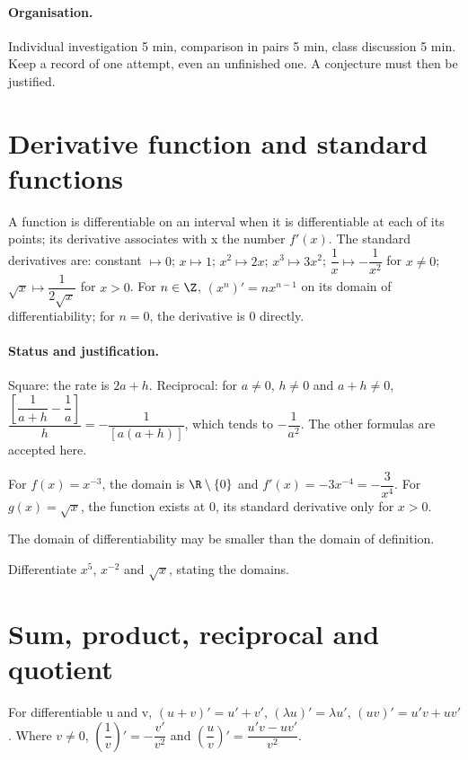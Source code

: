 \paragraph{Organisation.} Individual investigation 5 min, comparison in pairs 5 min, class discussion 5 min. Keep a record of one attempt, even an unfinished one. A conjecture must then be justified.
\mxnewpage
\section{Derivative function and standard functions}\label{C06-U1}
\begin{keypoint}
A function is differentiable on an interval when it is differentiable at each of its points; its derivative associates with x the number $f\prime(x)$. The standard derivatives are: constant $\mapsto0$; $x\mapsto1$; $x^2\mapsto2x$; $x^3\mapsto3x^2$; $\dfrac{1}{x}\mapsto -\dfrac{1}{x^2}$ for $x\ne0$; $\sqrt x\mapsto \dfrac{1}{2\sqrt x}$ for $x>0$. For $n\in\Z$, $(x^n)\prime=nx^{n-1}$ on its domain of differentiability; for $n=0$, the derivative is 0 directly.
\end{keypoint}
\paragraph{Status and justification.} Square: the rate is $2a+h$. Reciprocal: for $a\ne0$, $h\ne0$ and $a+h\ne0$, $\dfrac{[\dfrac{1}{a+h}-\dfrac{1}{a}]}{h}=-\dfrac{1}{[a(a+h)]}$, which tends to $-\dfrac{1}{a^2}$. The other formulas are accepted here.
\begin{example}For $f(x)=x^{-3}$, the domain is $\R\setminus\{0\}$ and $f\prime (x)=-3x^{-4}=-\dfrac{3}{x^4}$. For $g(x)=\sqrt x$, the function exists at 0, its standard derivative only for $x>0$.\end{example}\label{C06-EX1}
\begin{pitfall}The domain of differentiability may be smaller than the domain of definition.\end{pitfall}
\begin{application}Differentiate $x^5$, $x^{-2}$ and $\sqrt x$, stating the domains.\end{application}\label{C06-AP1}
\section{Sum, product, reciprocal and quotient}\label{C06-U2}
\begin{keypoint}
For differentiable u and v, $(u+v)\prime=u\prime+v\prime$, $(\lambda u)\prime=\lambda u\prime$, $(uv)\prime=u\prime v+uv\prime$. Where $v\ne0$, $(\dfrac{1}{v})\prime =-\dfrac{v\prime}{v^2}$ and $(\dfrac{u}{v})\prime =\dfrac{u\prime v-uv\prime}{v^2}$.
\end{keypoint}
